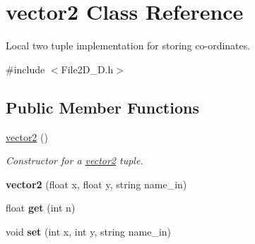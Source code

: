 \hypertarget{classvector2}{}\section{vector2 Class Reference}
\label{classvector2}


Local two tuple implementation for storing co-\/ordinates.  




{\ttfamily \#include $<$File2\+D\+\_\+D.\+h$>$}

\subsection*{Public Member Functions}
\begin{DoxyCompactItemize}
\item 
\mbox{\label{classvector2_afac6b6b75281b09ff43a6744dbda6289}} 
\mbox{\hyperlink{classvector2_afac6b6b75281b09ff43a6744dbda6289}{vector2}} ()
\begin{DoxyCompactList}\small\item\em Constructor for a \mbox{\hyperlink{classvector2}{vector2}} tuple. \end{DoxyCompactList}\item 
\mbox{\label{classvector2_afffc855d2b8a514f73337fb9c0939eb8}} 
{\bfseries vector2} (float x, float y, string name\+\_\+in)
\item 
\mbox{\label{classvector2_aa37036cc9f7cc97069f217ca17362ae4}} 
float {\bfseries get} (int n)
\item 
\mbox{\label{classvector2_aa3eadcf77d2ddf6546d234f8870588af}} 
void {\bfseries set} (int x, int y, string name\+\_\+in)
\end{DoxyCompactItemize}
